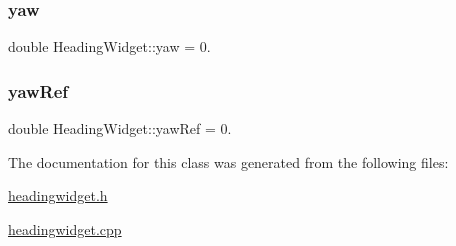 \mbox{\label{class_heading_widget_a2cbc993b84dec265c65a94f74929855f}} 
\subsubsection{\texorpdfstring{yaw}{yaw}}
{\footnotesize\ttfamily double Heading\+Widget\+::yaw = 0.}

\mbox{\label{class_heading_widget_a51f862347921bef258a4db4e9784687d}} 
\subsubsection{\texorpdfstring{yaw\+Ref}{yawRef}}
{\footnotesize\ttfamily double Heading\+Widget\+::yaw\+Ref = 0.}



The documentation for this class was generated from the following files\+:\begin{DoxyCompactItemize}
\item 
\mbox{\hyperlink{headingwidget_8h}{headingwidget.\+h}}\item 
\mbox{\hyperlink{headingwidget_8cpp}{headingwidget.\+cpp}}\end{DoxyCompactItemize}

